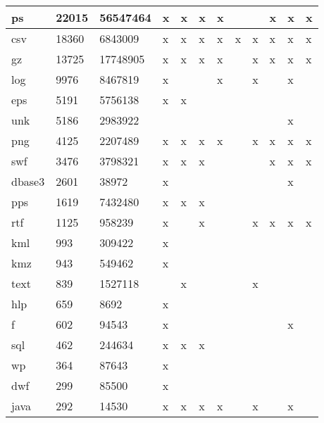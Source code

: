 \begin{table}[!ht]
\begin{tabular}{|l|l|l|l|l|l|l|l|l|l|l|l|}
ps        & 22015           & 56547464      & x & x & x & x &   &   & x & x & x   \\ \hline
csv       & 18360           & 6843009       & x & x & x & x & x & x & x & x & x   \\ \hline
gz        & 13725           & 17748905      & x & x & x & x &   & x & x & x & x   \\ \hline
log       & 9976            & 8467819       & x &   &   & x &   & x &   & x &     \\ \hline
eps       & 5191            & 5756138       & x & x &   &   &   &   &   &   &     \\ \hline
unk       & 5186            & 2983922       &   &   &   &   &   &   &   & x &     \\ \hline
png       & 4125            & 2207489       & x & x & x & x &   & x & x & x & x   \\ \hline
swf       & 3476            & 3798321       & x & x & x &   &   &   & x & x & x   \\ \hline
dbase3    & 2601            & 38972         & x &   &   &   &   &   &   & x &     \\ \hline
pps       & 1619            & 7432480       & x & x & x &   &   &   &   &   &     \\ \hline
rtf       & 1125            & 958239        & x &   & x &   &   & x & x & x & x   \\ \hline
kml       & 993             & 309422        & x &   &   &   &   &   &   &   &     \\ \hline
kmz       & 943             & 549462        & x &   &   &   &   &   &   &   &     \\ \hline
text      & 839             & 1527118       &   & x &   &   &   & x &   &   &     \\ \hline
hlp       & 659             & 8692          & x &   &   &   &   &   &   &   &     \\ \hline
f         & 602             & 94543         & x &   &   &   &   &   &   & x &     \\ \hline
sql       & 462             & 244634        & x & x & x &   &   &   &   &   &     \\ \hline
wp        & 364             & 87643         & x &   &   &   &   &   &   &   &     \\ \hline
dwf       & 299             & 85500         & x &   &   &   &   &   &   &   &     \\ \hline
java      & 292             & 14530         & x & x & x & x &   & x &   & x &     \\ \hline

\end{tabular}
\end{table}
